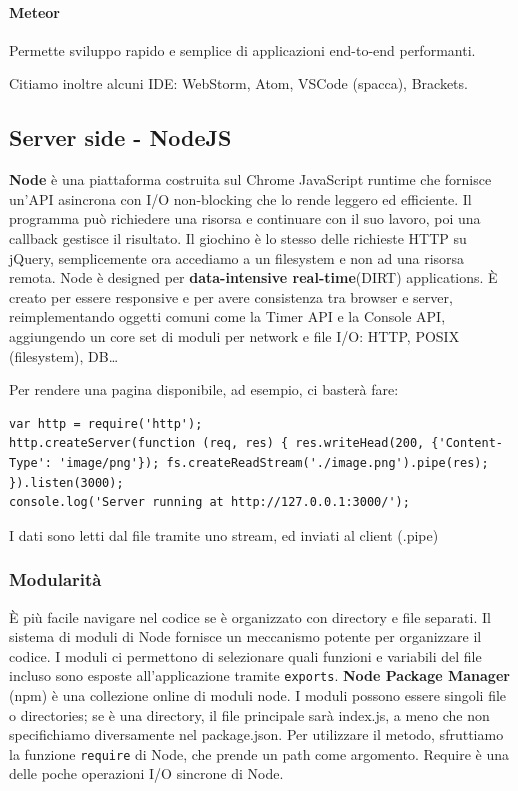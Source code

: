 \documentclass[11pt]{article}
\newcommand{\code}[1]{\texttt{#1}}
\begin{document}
\paragraph{Meteor} Permette sviluppo rapido e semplice di applicazioni end-to-end performanti. 

Citiamo inoltre alcuni IDE: WebStorm, Atom, VSCode (spacca), Brackets.
\subsection{Server side - NodeJS}
\textbf{Node} è una piattaforma costruita sul Chrome JavaScript runtime che fornisce un'API asincrona con I/O non-blocking che lo rende leggero ed efficiente. Il programma può richiedere una risorsa e continuare con il suo lavoro, poi una callback gestisce il risultato. Il giochino è lo stesso delle richieste HTTP su jQuery, semplicemente ora accediamo a un filesystem e non ad una risorsa remota. Node è designed per \textbf{data-intensive real-time}(DIRT) applications. È creato per essere responsive e per avere consistenza tra browser e server, reimplementando oggetti comuni come la Timer API e la Console API, aggiungendo un core set di moduli per network e file I/O: HTTP, POSIX (filesystem), DB\dots

Per rendere una pagina disponibile, ad esempio, ci basterà fare:
\begin{verbatim}
var http = require('http');
http.createServer(function (req, res) { res.writeHead(200, {'Content-Type': 'image/png'}); fs.createReadStream('./image.png').pipe(res);
}).listen(3000);
console.log('Server running at http://127.0.0.1:3000/');
\end{verbatim}
I dati sono letti dal file tramite uno stream, ed inviati al client (.pipe)
\subsubsection{Modularità}
È più facile navigare nel codice se è organizzato con directory e file separati. Il sistema di moduli di Node fornisce un meccanismo potente per organizzare il codice. I moduli ci permettono di selezionare quali funzioni e variabili del file incluso sono esposte all'applicazione tramite \code{exports}. \textbf{Node Package Manager} (npm) è una collezione online di moduli node. I moduli possono essere singoli file o directories; se è una directory, il file principale sarà index.js, a meno che non specifichiamo diversamente nel package.json. Per utilizzare il metodo, sfruttiamo la funzione \code{require} di Node, che prende un path come argomento. Require è una delle poche operazioni I/O sincrone di Node. 
\end{document}
